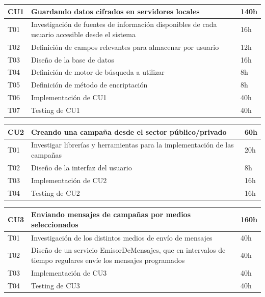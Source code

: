 \documentclass[a4paper, 10pt, twoside]{article}
\begin{document}
\begin{tabular}{lp{13cm}l}
  \hline
  CU1 & Guardando datos cifrados en servidores locales & 140h \\
  \hline
  T01 & Investigación de fuentes de información disponibles de cada usuario accesible desde el sistema & 16h \\
  T02 & Definición de campos relevantes para almacenar por usuario & 12h \\
  T03 & Diseño de la base de datos & 16h \\
  T04 & Definición de motor de búsqueda a utilizar & 8h \\
  T05 & Definición de método de encriptación & 8h \\
  T06 & Implementación de CU1 & 40h\\
  T07 & Testing de CU1 & 40h \\
  \hline
\end{tabular}

\vspace{1em}

\begin{tabular}{lp{13cm}l}
  \hline
  CU2 & Creando una campaña desde el sector público/privado & 60h \\
  \hline
  T01 & Investigar librerías y herramientas para la implementación de las campañas & 20h \\
  T02 & Diseño de la interfaz del usuario & 8h \\
  T03 & Implementación de CU2 & 16h \\
  T04 & Testing de CU2 & 16h \\
  \hline
\end{tabular}

\vspace{1em}

\begin{tabular}{lp{13cm}l}
  \hline
  CU3 &  Enviando mensajes de campañas por medios seleccionados & 160h \\
  \hline
  T01 & Investigación de los distintos medios de envío de mensajes & 40h \\
  T02 & Diseño de un servicio EmisorDeMensajes, que en intervalos de tiempo regulares envíe los mensajes programados & 40h \\
  T03 & Implementación de CU3 & 40h \\
  T04 & Testing de CU3 & 40h \\
  \hline
\end{tabular}

\vspace{1em}
\end{document}
